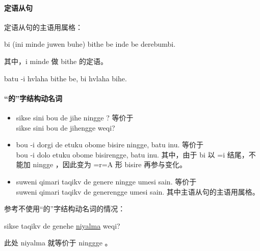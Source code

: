 \paragraph{定语从句} 定语从句的主语用属格：

bi (ini minde juwen buhe) bithe be inde be derebumbi.

其中，i minde   做 bithe 的定语。

batu -i hvlaha bithe be, bi  hvlaha bihe.

\paragraph{“的”字结构动名词}

\begin{itemize}
    \item sikse sini bou de jihe ningge ? 等价于\\
          sikse sini bou de jihengge weqi?
    \item bou -i dorgi de etuku obome bisire ningge, batu inu. 等价于\\
          bou -i dolo etuku obome bisirengge, batu inu. 其中，由于 bi 以 =i 结尾，不能加 ningge ，因此变为 =r=A 形 bisire 再参与变化。
    \item suweni qimari taqikv de genere ningge umesi sain. 等价于\\
          suweni qimari taqikv de generengge umesi sain. 其中主语从句的主语用属格。
\end{itemize}

参考不使用“的”字结构动名词的情况：

sikse taqikv de genehe \underline{niyalma} weqi?

此处 niyalma 就等价于 ninggge 。


